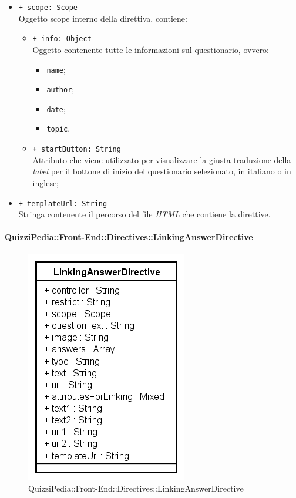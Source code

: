 \begin{itemize}
\begin{itemize}
				\item \texttt{+ scope: Scope} \\ Oggetto scope interno della direttiva, contiene:
				\begin{itemize}
					\item \texttt{+ info: Object} \\ Oggetto contenente tutte le informazioni sul questionario, ovvero:
					\begin{itemize}
						\item \texttt{name};
						\item \texttt{author};
						\item \texttt{date};
						\item \texttt{topic}.
					\end{itemize}
					\item \texttt{+ startButton: String} \\ Attributo che viene utilizzato per visualizzare la giusta traduzione della \textit{label} per il bottone di inizio del questionario selezionato, in italiano o in inglese; 
				\end{itemize}
				\item \texttt{+ templateUrl: String} \\ Stringa contenente il percorso del file \textit{HTML} che contiene la direttive.
			\end{itemize}
		\end{itemize}
		
		\paragraph{QuizziPedia::Front-End::Directives::LinkingAnswerDirective}
		
		\label{QuizziPedia::Front-End::Directives::LinkingAnswerDirective}
		
		\begin{figure}[ht]
			\centering
			\includegraphics[scale=0.80,keepaspectratio]{UML/Classi/Front-End/QuizziPedia_Front-end_Templates_LinkingAnswerTemplate.png}
			\caption{QuizziPedia::Front-End::Directives::LinkingAnswerDirective}
		\end{figure} \FloatBarrier		
		
